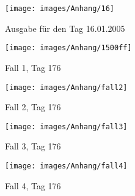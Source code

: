 \begin{figure}[h]
\begin{center}
\texttt{[image: images/Anhang/16]}
\end{center}
\caption{Ausgabe f\"ur den Tag 16.01.2005}
\label{fig:16}
\end{figure}


\begin{figure}[h]
\begin{center}
\texttt{[image: images/Anhang/1500ff]}
\end{center}
\caption{Fall 1, Tag 176}
\label{fig:fall1}
\end{figure}


\begin{figure}[h]
\begin{center}
\texttt{[image: images/Anhang/fall2]}
\end{center}
\caption{Fall 2, Tag 176}
\label{fig:fall2}
\end{figure}


\begin{figure}[h]
\begin{center}
\texttt{[image: images/Anhang/fall3]}
\end{center}
\caption{Fall 3, Tag 176}
\label{fig:fall3}
\end{figure}


\begin{figure}[h]
\begin{center}
\texttt{[image: images/Anhang/fall4]}
\end{center}
\caption{Fall 4, Tag 176}
\label{fig:fall4}
\end{figure}
